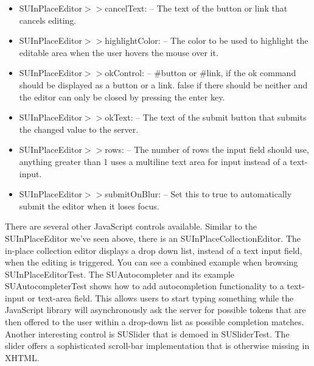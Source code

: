 \documentclass[a4paper,10pt,twoside]{book}
\newcommand{\ct}[1]{{\small\ttfamily\textup{#1}}}
\begin{document}
\begin{itemize}
\item  \ct{SUInPlaceEditor$>$$>$cancelText:} -- The text of the button or link that cancels editing. 
\item  \ct{SUInPlaceEditor$>$$>$highlightColor:} -- The color to be used to highlight the editable area when the user hovers the mouse over it. 
\item  \ct{SUInPlaceEditor$>$$>$okControl:} -- \ct{\#button} or \ct{\#link}, if the ok command should be displayed as a button or a link. \ct{false} if there should be neither and the editor can only be closed by pressing the enter key. 
\item  \ct{SUInPlaceEditor$>$$>$okText:} -- The text of the submit button that submits the changed value to the server. 
\item  \ct{SUInPlaceEditor$>$$>$rows:} -- The number of rows the input field should use, anything greater than 1 uses a multiline text area for input instead of a text-input. 
\item  \ct{SUInPlaceEditor$>$$>$submitOnBlur:} -- Set this to \ct{true} to automatically submit the editor when it loses focus. 
\end{itemize}

There are several other JavaScript controls available. Similar to the  \ct{SUInPlaceEditor} we've seen above, there is an  \ct{SUInPlaceCollectionEditor}. The in-place collection editor displays a drop down list, instead of a text input field, when the editing is triggered. You can see a combined example when browsing  \ct{SUInPlaceEditorTest}. The  \ct{SUAutocompleter} and its example  \ct{SUAutocompleterTest} shows how to add autocompletion functionality to a text-input or text-area field. This allows users to start typing something while the JavaScript library will asynchronously ask the server for possible tokens that are then offered to the user within a drop-down list as possible completion matches. Another interesting control is  \ct{SUSlider} that is demoed in  \ct{SUSliderTest}. The slider offers a sophisticated scroll-bar implementation that is otherwise missing in XHTML.
\end{document}
